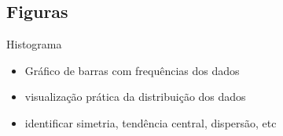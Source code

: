 \documentclass{beamer}
\begin{document}



\subsection{Figuras}


\begin{frame}{Histograma}
  \begin{itemize}
    \footnotesize
  \item Gráfico de barras com frequências dos dados
    \bigskip
  \item visualização prática da distribuição dos dados
    \bigskip
  \item identificar simetria, tendência central, dispersão, etc
  \end{itemize}
\end{frame}
\end{document}
